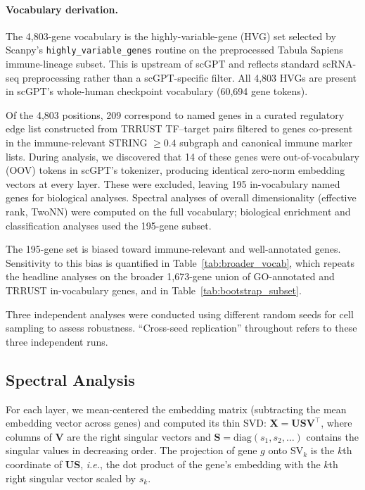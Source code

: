 \documentclass[12pt]{article}
\newcommand{\SV}[1]{\mathrm{SV}_{#1}}
\newcommand{\ie}{\textit{i.e.}}
\begin{document}
\paragraph{Vocabulary derivation.}
The 4{,}803-gene vocabulary is the highly-variable-gene (HVG) set selected by Scanpy's \texttt{highly\_variable\_genes} routine on the preprocessed Tabula Sapiens immune-lineage subset.
This is upstream of scGPT and reflects standard scRNA-seq preprocessing rather than a scGPT-specific filter.
All 4{,}803 HVGs are present in scGPT's whole-human checkpoint vocabulary (60{,}694 gene tokens).

Of the 4{,}803 positions, 209 correspond to named genes in a curated regulatory edge list constructed from TRRUST TF--target pairs filtered to genes co-present in the immune-relevant STRING $\geq 0.4$ subgraph and canonical immune marker lists.
During analysis, we discovered that 14 of these genes were out-of-vocabulary (OOV) tokens in scGPT's tokenizer, producing identical zero-norm embedding vectors at every layer.
These were excluded, leaving 195 in-vocabulary named genes for biological analyses.
Spectral analyses of overall dimensionality (effective rank, TwoNN) were computed on the full vocabulary; biological enrichment and classification analyses used the 195-gene subset.

The 195-gene set is biased toward immune-relevant and well-annotated genes.
Sensitivity to this bias is quantified in Table~\ref{tab:broader_vocab}, which repeats the headline analyses on the broader 1{,}673-gene union of GO-annotated and TRRUST in-vocabulary genes, and in Table~\ref{tab:bootstrap_subset}.

Three independent analyses were conducted using different random seeds for cell sampling to assess robustness.
``Cross-seed replication'' throughout refers to these three independent runs.

\subsection{Spectral Analysis}
For each layer, we mean-centered the embedding matrix (subtracting the mean embedding vector across genes) and computed its thin SVD: $\mathbf{X} = \mathbf{U} \mathbf{S} \mathbf{V}^\top$, where columns of $\mathbf{V}$ are the right singular vectors and $\mathbf{S} = \mathrm{diag}(s_1, s_2, \ldots)$ contains the singular values in decreasing order.
The projection of gene $g$ onto $\SV{k}$ is the $k$th coordinate of $\mathbf{U}\mathbf{S}$, \ie, the dot product of the gene's embedding with the $k$th right singular vector scaled by $s_k$.
\end{document}
